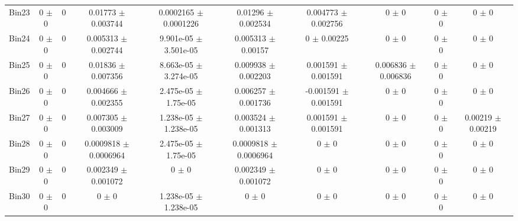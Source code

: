 \begin{tabular}{@{\extracolsep{4pt}}lccccccccc@{}}
     Bin23 & 0 $\pm$ 0 & 0 & 0.01773 $\pm$ 0.003744 & 0.0002165 $\pm$ 0.0001226 & 0.01296 $\pm$ 0.002534 & 0.004773 $\pm$ 0.002756 & 0 $\pm$ 0 & 0 $\pm$ 0 & 0 $\pm$ 0 \\ 
     Bin24 & 0 $\pm$ 0 & 0 & 0.005313 $\pm$ 0.002744 & 9.901e-05 $\pm$ 3.501e-05 & 0.005313 $\pm$ 0.00157 & 0 $\pm$ 0.00225 & 0 $\pm$ 0 & 0 $\pm$ 0 & 0 $\pm$ 0 \\ 
     Bin25 & 0 $\pm$ 0 & 0 & 0.01836 $\pm$ 0.007356 & 8.663e-05 $\pm$ 3.274e-05 & 0.009938 $\pm$ 0.002203 & 0.001591 $\pm$ 0.001591 & 0.006836 $\pm$ 0.006836 & 0 $\pm$ 0 & 0 $\pm$ 0 \\ 
     Bin26 & 0 $\pm$ 0 & 0 & 0.004666 $\pm$ 0.002355 & 2.475e-05 $\pm$ 1.75e-05 & 0.006257 $\pm$ 0.001736 & -0.001591 $\pm$ 0.001591 & 0 $\pm$ 0 & 0 $\pm$ 0 & 0 $\pm$ 0 \\ 
     Bin27 & 0 $\pm$ 0 & 0 & 0.007305 $\pm$ 0.003009 & 1.238e-05 $\pm$ 1.238e-05 & 0.003524 $\pm$ 0.001313 & 0.001591 $\pm$ 0.001591 & 0 $\pm$ 0 & 0 $\pm$ 0 & 0.00219 $\pm$ 0.00219 \\ 
     Bin28 & 0 $\pm$ 0 & 0 & 0.0009818 $\pm$ 0.0006964 & 2.475e-05 $\pm$ 1.75e-05 & 0.0009818 $\pm$ 0.0006964 & 0 $\pm$ 0 & 0 $\pm$ 0 & 0 $\pm$ 0 & 0 $\pm$ 0 \\ 
     Bin29 & 0 $\pm$ 0 & 0 & 0.002349 $\pm$ 0.001072 & 0 $\pm$ 0 & 0.002349 $\pm$ 0.001072 & 0 $\pm$ 0 & 0 $\pm$ 0 & 0 $\pm$ 0 & 0 $\pm$ 0 \\ 
     Bin30 & 0 $\pm$ 0 & 0 & 0 $\pm$ 0 & 1.238e-05 $\pm$ 1.238e-05 & 0 $\pm$ 0 & 0 $\pm$ 0 & 0 $\pm$ 0 & 0 $\pm$ 0 & 0 $\pm$ 0 \\ 
\hline\hline
  \end{tabular}
